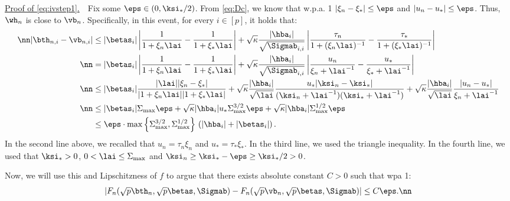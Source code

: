 \vspace{2pt}
\noindent\underline{Proof of \eqref{eq:ivstep1}.}~~Fix some $\eps\in(0,\ksi_*/2)$. From \eqref{eq:Dc}, we know that w.p.a. 1 $|\xi_n-\xi_*|\leq \eps$ and $|u_n-u_*|\leq \eps$. Thus, $\wh_n$ is close to $\vb_n$. Specifically, in this event, for every $i\in[p]$, it holds that:
\begin{align}
\nn|\bth_{n,i} - \vb_{n,i}| &\leq {|\betas_i|}\left|\frac{1}{1+\xi_n\lai}-\frac{1}{1+\xi_*\lai}\right| + \sqrt{\kappa}\frac{|\hba_i|}{\sqrt{\Sigmab_{i,i}}}\left|\frac{\tau_n}{1+(\xi_n\lai)^{-1}}-\frac{\tau_*}{1+(\xi_*\lai)^{-1}}\right| \\
\nn&= {|\betas_i|}\left|\frac{1}{1+\xi_n\lai}-\frac{1}{1+\xi_*\lai}\right| + \sqrt{\kappa}\frac{|\hba_i|}{\sqrt{\Sigmab_{i,i}}}\left|\frac{u_n}{\xi_n+\lai^{-1}}-\frac{u_*}{\xi_*+\lai^{-1}}\right| \\
\nn& \leq
{|\betas_i|}\frac{|\lai||\xi_n-\xi_*|}{|1+\xi_n\lai||1+\xi_*\lai|} + \sqrt{\kappa}\frac{|\hba_i|}{\sqrt{\lai}}  \frac{u_*|\ksi_n-\ksi_*|}{(\ksi_n+\lai^{-1})(\ksi_*+\lai^{-1})} + 
\sqrt{\kappa}\frac{|\hba_i|}{\sqrt{\lai}}\frac{|u_n-u_*|}{\xi_n+\lai^{-1}}
\\
\nn& \leq
{|\betas_i|}{\Sigma_{\max}\eps} + \sqrt{\kappa}{|\hba_i|} u_*\Sigma_{\max}^{3/2} \eps+ 
\sqrt{\kappa}|\hba_i|\Sigma_{\max}^{1/2}\eps
\\
&\leq \eps \cdot \max\left\{\Sigma_{\max}^{3/2},\Sigma_{\max}^{1/2}\right\}\, \left(|\hba_i| + |\betas_i|\right).\label{eq:betav}
\end{align}%
In the second line above, we recalled that $u_n=\tau_n\xi_n$ and $u_*=\tau_*\xi_*$. In the third line, we used the triangle inequality. In the fourth line, we used that $\ksi_*>0$, $0<\lai\leq\Sigma_{\max}$ and $\ksi_n\geq \ksi_*-\eps \geq \ksi_*/2 >0$. 

Now, we will use this and Lipschitzness of $f$ to argue that there exists absolute constant $C>0$ such that wpa 1:
\begin{align}
|F_n(\sqrt{p}\bth_n,\sqrt{p}\betas,\Sigmab) - F_n(\sqrt{p}\vb_n,\sqrt{p}\betas,\Sigmab) | \leq C\eps.\nn
\end{align}

